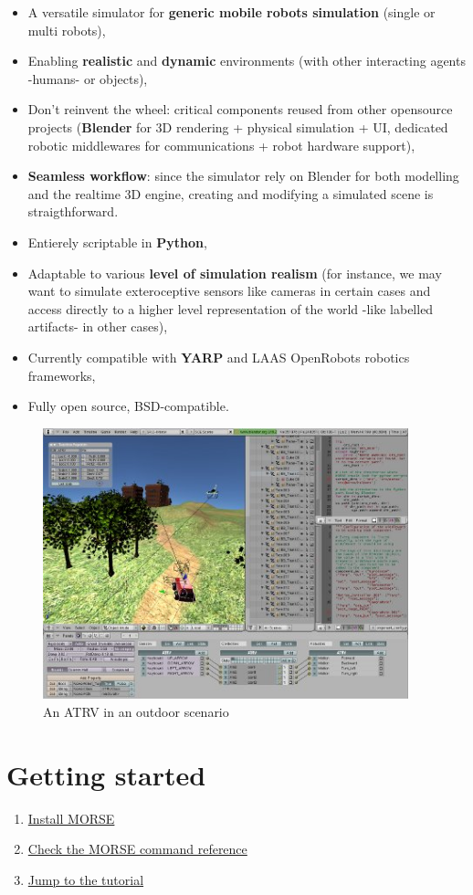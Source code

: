 \documentclass[twoside,a4paper,10pt]{report}
\newcommand{\dokutitleleveltwo}[1]{\section{#1}}
\newcommand{\dokubold}[1]{\textbf{#1}}
\newcommand{\dokuitem}{\item}
\begin{document}
\begin{itemize}
\dokuitem  A versatile simulator for \dokubold{generic mobile robots simulation} (single or multi robots),
\dokuitem  Enabling \dokubold{realistic} and \dokubold{dynamic} environments (with other interacting agents -humans- or objects), 
\dokuitem  Don't reinvent the wheel: critical components reused from other opensource projects (\dokubold{Blender} for 3D rendering + physical simulation + UI, dedicated robotic middlewares for communications + robot hardware support),
\dokuitem  \dokubold{Seamless workflow}: since the simulator rely on Blender for both modelling and the realtime 3D engine, creating and modifying a simulated scene is straigthforward.
\dokuitem  Entierely scriptable in \dokubold{Python},
\dokuitem  Adaptable to various \dokubold{level of simulation realism} (for instance, we may want to simulate exteroceptive sensors like cameras in certain cases and access directly to a higher level representation of the world -like labelled artifacts- in other cases),
\dokuitem  Currently compatible with \dokubold{YARP} and LAAS OpenRobots robotics frameworks,
\dokuitem  Fully open source, BSD-compatible.
\end{itemize}

\begin{figure}[h]
\centering
\includegraphics[width=300pt]{outdoor_example.jpg}
\caption{An ATRV in an outdoor scenario}
\end{figure}



\dokutitleleveltwo{Getting started}
\label{46b862bd16703034ef594b2996ec8166}%

\begin{enumerate}\dokuitem  \hyperref[ea09bb364ef1bffd889e76b7a59035fc]{ Install MORSE}
\dokuitem  \hyperref[60efe788544a384827c39a9803dab85b]{ Check the MORSE command reference}
\dokuitem  \hyperref[0575c8d592fb7b088226750aceec2b4e]{ Jump to the tutorial}
\end{enumerate}
\end{document}
